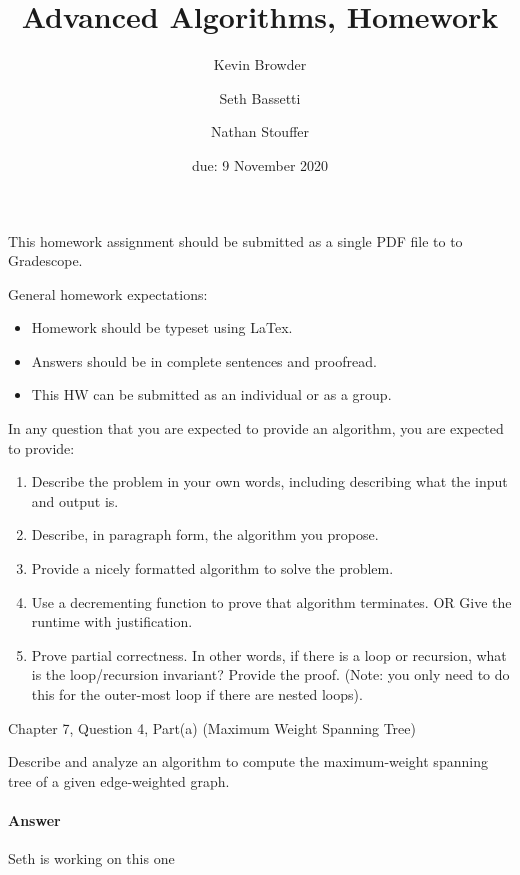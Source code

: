\documentclass{article}
\title{Advanced Algorithms, Homework \hwnum}
\author{Kevin Browder \and Seth Bassetti \and Nathan Stouffer}
\date{due: 9 November 2020}
\begin{document}
\maketitle

This homework assignment should be submitted as a single PDF file to to Gradescope.

General homework expectations:
\begin{itemize}
    \item Homework should be typeset using LaTex.
    \item Answers should be in complete sentences and proofread.
    \item This HW can be submitted as an individual or as a group.
\end{itemize}

In any question that you are expected to provide an algorithm, you are expected to provide:
\begin{enumerate}
    \item Describe the problem in your own words, including describing what the input and output is.
    \item Describe, in paragraph form, the algorithm you propose.
    \item Provide a nicely formatted algorithm to solve the problem.
    \item Use a decrementing function to prove that algorithm terminates. OR  Give the runtime with justification.
    \item Prove partial correctness.
    In other words, if there is a loop or recursion, what is the loop/recursion invariant?
    Provide the proof.
    (Note: you only need to do this for the outer-most loop if there are nested loops).
\end{enumerate}

\nextprob
{}

Chapter 7, Question 4, Part(a) (Maximum Weight Spanning Tree)

Describe and analyze an algorithm to compute the maximum-weight spanning tree of a given edge-weighted graph.

\paragraph{Answer}


Seth is working on this one

\end{document}
